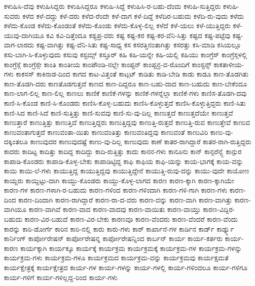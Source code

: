 {ಕಳುಹಿಸಿ-ದೆವು
ಕಳುಹಿಸಿದ್ದರು
ಕಳುಹಿಸಿದ್ದರೂ
ಕಳುಹಿ-ಸಿದ್ದೆ
ಕಳುಹಿಸಿ-ರ-ಬಹು-ದೆಂದು
ಕಳುಹಿ-ಸುತ್ತಿದ್ದರು
ಕಳುಹಿ-ಸುವರು
ಕಳೆದ
ಕಳೆ-ದದ್ದು
ಕಳೆ-ದರು
ಕಳೆದ-ರೆಂದೇ
ಕಳೆ-ದಾಗ
ಕಳೆ-ದಿದ್ದೆ
ಕಳೆದಿರ-ಬಹುದು
ಕಳೆದಿ-ರು-ವುದು
ಕಳೆದು
ಕಳೆದು-ಕೊಂಡ
ಕಳೆದು-ಕೊಂಡಂತೆ
ಕಳೆದು-ಕೊಂಡು
ಕಳೆದು-ಕೊಳ್ಳ-ಲಿಲ್ಲ
ಕಳೆದೆ
ಕಳೆ-ಯಲು
ಕಳೆ-ಯುತ್ತಿದ್ದರು
ಕಳೆ-ಯುವು-ದಾಗಿಯೂ
ಕವಿ
ಕವಿ-ದಿತ್ತೆಂದೂ
ಕಶ್ಯಪ್ರ-ವರು
ಕಷ್ಟ
ಕಷ್ಟ-ಕರ
ಕಷ್ಟ-ಕರ-ವೆನಿ-ಸಿತ್ತು
ಕಷ್ಟದ
ಕಷ್ಟ-ಪಟ್ಟೆವು
ಕಷ್ಟ-ವಾಗ-ಲಾರದು
ಕಷ್ಟ-ವಾಗಿತ್ತು
ಕಷ್ಟ-ವೆನಿ-ಸಿತು
ಕಷ್ಟ-ಸಾಧ್ಯ
ಕಸ
ಕಸರತ್ತಿನಂತಾಗಿತ್ತು
ಕಸರತ್ತು
ಕಸಿ-ಮಾಡಿ
ಕಸಿಯಲ್ಲೂ
ಕಸು-ಬಾಗಿ-ಸಿ-ಕೊಳ್ಳುವುದು
ಕಸುವು
ಕಸ್ಟಮ್ಸ್
ಕಸ್ತೂರ್
ಕಹಿ
ಕಹಿ-ಯನ್ನೇ
ಕಹಿ-ಯಲ್ಲಿ
ಕಹಿಯು
ಕಾಂಗ್ರೆಸ್
ಕಾಂಗ್ರೆಸ್ಗಳಲ್ಲಿ
ಕಾಂಗ್ರೆಸ್ಗೆ
ಕಾಂಗ್ರೆಸ್ಗೇ
ಕಾಂತಿ
ಕಾಂತೀಯ
ಕಾಂಪೌಂಡಿ-ನಲ್ಲೇ
ಕಾಂಪ್ಟನ್
ಕಾಂಪ್ಟನ್ರ-ವ-ರೊಂದಿಗೆ
ಕಾಂಸ್ಟನ್ಸ್
ಕಾಕತಾಳೀಯ-ಗಳು
ಕಾಕಸಸ್
ಕಾಕಿನಾಡ-ದಿಂದ
ಕಾಗದ
ಕಾಟ-ವಿತ್ತಂತೆ
ಕಾಟ್ಗಟ್
ಕಾಡಿತು
ಕಾಡಿ-ಬೇಡಿ
ಕಾಡು
ಕಾಡೂ
ಕಾಣ-ತೊಡಗಿತು
ಕಾಣ-ತೊಡಗಿ-ದರು
ಕಾಣತೊಡಗುತ್ತದೆ
ಕಾಣದ
ಕಾಣ-ದಿದ್ದರೂ
ಕಾಣ-ಬಹು-ದಾದ
ಕಾಣ-ಬಹುದು
ಕಾಣ-ಬೇಕೆಂದೂ
ಕಾಣ-ಲಾಗ-ಲಿಲ್ಲ
ಕಾಣ-ಲಿಲ್ಲ
ಕಾಣಲು
ಕಾಣಿಕೆ
ಕಾಣಿಕೆ-ಗಳನ್ನು
ಕಾಣಿಕೆ-ಗಳನ್ನೆಲ್ಲಾ
ಕಾಣಿಕೆ-ಗಳು
ಕಾಣಿಸ-ತೊಡಗಿ-ದವು
ಕಾಣಿ-ಸಿ-ಕೊಂಡ
ಕಾಣಿ-ಸಿ-ಕೊಂಡರು
ಕಾಣಿಸಿ-ಕೊಳ್ಳ-ಬಹುದು
ಕಾಣಿಸಿ-ಕೊಳ್ಳುತ್ತದೆ
ಕಾಣಿಸಿ-ಕೊಳ್ಳುತ್ತಿದ್ದರು
ಕಾಣಿ-ಸಿತು
ಕಾಣಿ-ಸಿದ
ಕಾಣಿ-ಸಿದೆ
ಕಾಣಿ-ಸುತ್ತಿತ್ತು
ಕಾಣಿ-ಸುವವು
ಕಾಣಿ-ಸು-ವು-ದಿಲ್ಲ
ಕಾಣುತ್ತದೆ
ಕಾಣುತ್ತದೆಯೇ
ಕಾಣುತ್ತವೆ
ಕಾಣುತ್ತಾರೆ
ಕಾಣುತ್ತಿತ್ತು
ಕಾಣುತ್ತಿದೆ
ಕಾಣುತ್ತಿದ್ದರು
ಕಾಣುತ್ತಿದ್ದವು
ಕಾಣುತ್ತಿ-ರುತ್ತದೆ
ಕಾಣುತ್ತಿ-ರುವ
ಕಾಣುತ್ತೇವೆ
ಕಾಣುವ
ಕಾಣುವಂತಾಗುತ್ತದೆ
ಕಾಣುವಂತಾ-ಯಿತು
ಕಾಣುವಂತಿತ್ತು
ಕಾಣುವಂತಿದ್ದವು
ಕಾಣುವಂತೆ
ಕಾಣುವಿರಿ
ಕಾಣು-ವು-ದಕ್ಕಿಂತಲೂ
ಕಾಣುವುದರ
ಕಾಣುವುದಷ್ಟೆ
ಕಾಣು-ವು-ದಿಲ್ಲ
ಕಾಣುವುದು
ಕಾಣೆ
ಕಾತರ-ರಾಗಿದ್ದಾರೆ
ಕಾತರ-ರಾಗಿ-ರುತ್ತಿದ್ದರು
ಕಾದರು
ಕಾದಿಟ್ಟ
ಕಾದಿತ್ತು
ಕಾದಿದ್ದ
ಕಾದಿದ್ದು
ಕಾದಿ-ರುತ್ತಿತ್ತು
ಕಾದು
ಕಾನನ-ಗಳು
ಕಾನೂನು
ಕಾನ್
ಕಾನ್ಫರೆನ್ಸ್ಗೆ
ಕಾನ್ಪುರ
ಕಾಪಾಡಿ-ಕೊಂಡರು
ಕಾಪಾಡಿ-ಕೊಳ್ಳ-ಬೇಕು
ಕಾಪಾಡಿಟ್ಟಿದ್ದ
ಕಾಫಿ
ಕಾಫಿಯ
ಕಾಫಿ-ಯನ್ನು
ಕಾಯ-ಭಾಗಕ್ಕೆ
ಕಾಯ-ವನ್ನು
ಕಾಯಿ
ಕಾಯಿ-ಲೆ-ಗಳು
ಕಾಯುತ್ತಿದ್ದ
ಕಾಯುತ್ತಿದ್ದವು
ಕಾಯುತ್ತಿದ್ದೇನೆ
ಕಾಯುತ್ತಿ-ರುವು-ದನ್ನು
ಕಾಯು-ವುದೇ
ಕಾಯೋಣ
ಕಾಯ್ದರು
ಕಾಯ್ದಿಟ್ಟು-ದಾಗಿ
ಕಾಯ್ದು-ಕೊಂಡರು
ಕಾಯ್ದು-ಕೊಳ್ಳ-ಲಾಗದ
ಕಾರಣ
ಕಾರಣ-ಕ್ಕಾಗಿ
ಕಾರಣ-ಕ್ಕಾಗಿಯೇ
ಕಾರಣ-ಗಳ
ಕಾರಣ-ಗಳಾಗಿ-ರ-ಬಹುದು
ಕಾರಣ-ಗಳಿಂದ
ಕಾರಣ-ಗಳಿಂದಾಗಿ
ಕಾರಣ-ಗಳಿ-ಗಾಗಿ
ಕಾರಣ-ಗಳು
ಕಾರಣ-ದಿಂದ
ಕಾರಣ-ದಿಂದಾಗಿ
ಕಾರಣ-ರಾಗಿದ್ದಾರೆ
ಕಾರಣ-ರಾ-ದ-ವರು
ಕಾರಣ-ವನ್ನು
ಕಾರಣ-ವಾಗಿ
ಕಾರಣ-ವಾಗಿತ್ತು
ಕಾರಣ-ವಾಗಿಯೂ
ಕಾರಣ-ವಾಗಿವೆ
ಕಾರಣ-ವಾದ
ಕಾರಣ-ವಾದವು
ಕಾರಣ-ವಾಯಿತು
ಕಾರಣ-ವಾಯ್ತು
ಕಾರಣ-ವಿದ್ದಿರ-ಬಹುದು
ಕಾರಣ-ವಿರ-ಬಹುದೆ
ಕಾರಣ-ವಿರ-ಬೇಕು
ಕಾರಣವೂ
ಕಾರಣ-ವೆಂದರು
ಕಾರಣ-ವೆಂದರೆ
ಕಾರಣ-ವೆಂದು
ಕಾರನ್ನು
ಕಾರಿ-ಡೋರ್ಗೆ
ಕಾರಿನ
ಕಾರಿ-ನಲ್ಲಿ
ಕಾರು
ಕಾರು-ಗಳು
ಕಾರ್
ಕಾರ್ಖಾನೆ-ಗಳ
ಕಾರ್ಡಿನ
ಕಾರ್ಡ್
ಕಾರ್ಡ್ನ್ನು
ಕಾರ್ನಿಂಗ್
ಕಾರ್ಪೋರೇಷನ್
ಕಾರ್ಪೋರೇಷನ್ನ
ಕಾರ್ಪೋರೇಷನ್ನಿಂದ
ಕಾರ್ಬನ್
ಕಾರ್ಯ
ಕಾರ್ಯ-ಕರ್ತರು
ಕಾರ್ಯ-ಕಾರಣ
ಕಾರ್ಯಕ್ಕಾಗಿ
ಕಾರ್ಯಕ್ಕೂ
ಕಾರ್ಯಕ್ಕೆ
ಕಾರ್ಯಕ್ರಮ
ಕಾರ್ಯಕ್ರಮಕ್ಕೆ
ಕಾರ್ಯಕ್ರಮ-ಗಳ
ಕಾರ್ಯಕ್ರಮ-ಗಳನ್ನು
ಕಾರ್ಯಕ್ರಮ-ಗಳು
ಕಾರ್ಯಕ್ರಮ-ಗಳೂ
ಕಾರ್ಯಕ್ರಮದ
ಕಾರ್ಯಕ್ರಮ-ವನ್ನು
ಕಾರ್ಯಕ್ರಮವು
ಕಾರ್ಯಕ್ಷಮತೆ
ಕಾರ್ಯಕ್ಷೇತ್ರಕ್ಕೆ
ಕಾರ್ಯಕ್ಷೇತ್ರದ
ಕಾರ್ಯ-ಗಳ
ಕಾರ್ಯ-ಗಳನ್ನು
ಕಾರ್ಯ-ಗಳಲ್ಲಿ
ಕಾರ್ಯ-ಗಳಿಂದಲೂ
ಕಾರ್ಯ-ಗಳಿಗೂ
ಕಾರ್ಯ-ಗಳಿಗೆ
ಕಾರ್ಯ-ಗಳಿಲ್ಲದ್ದ-ರಿಂದ
ಕಾರ್ಯ-ಗಳು
}
